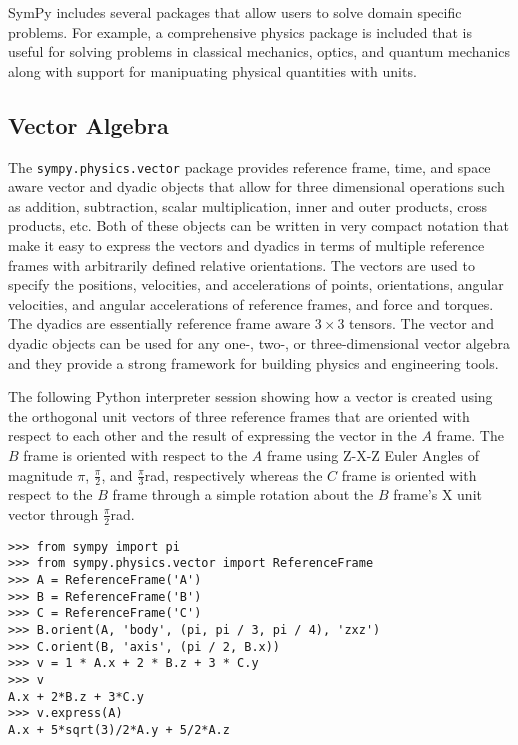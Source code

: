 SymPy includes several packages that allow users to solve domain specific
problems. For example, a comprehensive physics package is included that is
useful for solving problems in classical mechanics, optics, and quantum
mechanics along with support for manipuating physical quantities with units.

\subsection{Vector Algebra}

The \texttt{sympy.physics.\allowbreak{}vector} package provides reference frame, time, and
space aware vector and dyadic objects that allow for three dimensional
operations such as addition, subtraction, scalar multiplication, inner and
outer products, cross products, etc. Both of these objects can be written in
very compact notation that make it easy to express the vectors and dyadics in
terms of multiple reference frames with arbitrarily defined relative
orientations. The vectors are used to specify the positions, velocities, and
accelerations of points, orientations, angular velocities, and angular
accelerations of reference frames, and force and torques. The dyadics are
essentially reference frame aware $3 \times 3$ tensors. The vector and dyadic
objects can be used for any one-, two-, or three-dimensional vector algebra and
they provide a strong framework for building physics and engineering tools.

The following Python interpreter session showing how a vector is created using
the orthogonal unit vectors of three reference frames that are oriented with
respect to each other and the result of expressing the vector in the $A$
frame. The $B$ frame is oriented with respect to the $A$ frame using Z-X-Z
Euler Angles of magnitude $\pi$, $\frac{\pi}{2}$, and
$\frac{\pi}{3}$\si{\radian}, respectively whereas the $C$ frame is oriented
with respect to the $B$ frame through a simple rotation about the $B$ frame's
X unit vector through $\frac{\pi}{2}$\si{\radian}.

\begin{verbatim}
>>> from sympy import pi
>>> from sympy.physics.vector import ReferenceFrame
>>> A = ReferenceFrame('A')
>>> B = ReferenceFrame('B')
>>> C = ReferenceFrame('C')
>>> B.orient(A, 'body', (pi, pi / 3, pi / 4), 'zxz')
>>> C.orient(B, 'axis', (pi / 2, B.x))
>>> v = 1 * A.x + 2 * B.z + 3 * C.y
>>> v
A.x + 2*B.z + 3*C.y
>>> v.express(A)
A.x + 5*sqrt(3)/2*A.y + 5/2*A.z
\end{verbatim}

